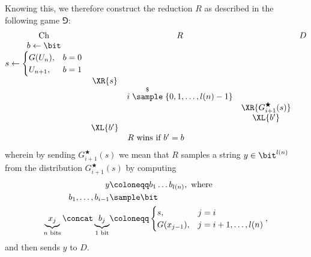 \begin{answer}
    Knowing this, we therefore construct the reduction $R$ as described in the following game $\Game$:
    {
        \[
            \begin{array}{@{} c c c c c@{}}
            \text{Ch} & & R & & D \\
            b \leftarrow \bit & & & &\\
            s \leftarrow \begin{cases} 
                G(U_n), &b = 0 \\
                U_{n+1}, &b = 1 
            \end{cases} & & & &\\
            & \XR{s} & & &\\
            & & i\stackrel{\$}{\sample} \{0,1,\ldots,l(n)-1\} & & \\
            & & & \XR{G^\bigstar_{i +1}(s)} & \\
            & & & \XL{b'} &\\
            & \XL{b'} & & &\\
            \multicolumn{5}{c}{\text{$R$ wins if $b' = b$}}
        \end{array}
        \]
        \vspace{-0.5cm}
        \label{fig:p6-game3}
    }
    \noindent wherein by sending $G^\bigstar_{i +1}(s)$ we mean that $R$ samples a string $y\in\bit^{l(n)}$ from the distribution $G^\bigstar_{i +1}(s)$ by computing
    \begin{align*}
        y &\coloneqq b_1\ldots b_{l(n)},\textrm{ where}\\
        b_1,\ldots, b_{i-1}&\sample \bit\\
        \underbrace{x_j}_{n \textrm{ bits}}\concat \underbrace{b_j}_{1 \textrm{ bit}} &\coloneqq \begin{cases}
            s, & j=i\\
            G(x_{j-1}), & j=i+1,\ldots,l(n)
        \end{cases},
    \end{align*}
    and then sends $y$ to $D$.
    

\end{answer}
